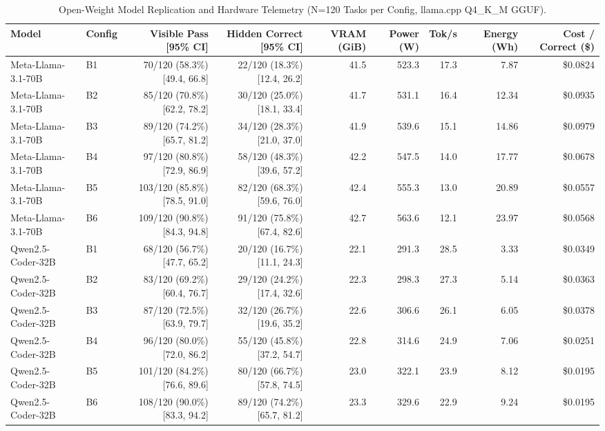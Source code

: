 \begin{table}[t]
\centering\small
\caption{Open-Weight Model Replication and Hardware Telemetry (N=120 Tasks per Config, llama.cpp Q4\_K\_M GGUF).}
\label{tab:open_weight}
\begin{tabular}{llrrrrrrr}
\toprule
Model & Config & Visible Pass [95\% CI] & Hidden Correct [95\% CI] & VRAM (GiB) & Power (W) & Tok/s & Energy (Wh) & Cost / Correct (\$) \\
\midrule
Meta-Llama-3.1-70B & B1 & 70/120 (58.3\%) [49.4, 66.8] & 22/120 (18.3\%) [12.4, 26.2] & 41.5 & 523.3 & 17.3 & 7.87 & \$0.0824 \\
Meta-Llama-3.1-70B & B2 & 85/120 (70.8\%) [62.2, 78.2] & 30/120 (25.0\%) [18.1, 33.4] & 41.7 & 531.1 & 16.4 & 12.34 & \$0.0935 \\
Meta-Llama-3.1-70B & B3 & 89/120 (74.2\%) [65.7, 81.2] & 34/120 (28.3\%) [21.0, 37.0] & 41.9 & 539.6 & 15.1 & 14.86 & \$0.0979 \\
Meta-Llama-3.1-70B & B4 & 97/120 (80.8\%) [72.9, 86.9] & 58/120 (48.3\%) [39.6, 57.2] & 42.2 & 547.5 & 14.0 & 17.77 & \$0.0678 \\
Meta-Llama-3.1-70B & B5 & 103/120 (85.8\%) [78.5, 91.0] & 82/120 (68.3\%) [59.6, 76.0] & 42.4 & 555.3 & 13.0 & 20.89 & \$0.0557 \\
Meta-Llama-3.1-70B & B6 & 109/120 (90.8\%) [84.3, 94.8] & 91/120 (75.8\%) [67.4, 82.6] & 42.7 & 563.6 & 12.1 & 23.97 & \$0.0568 \\
\midrule
Qwen2.5-Coder-32B & B1 & 68/120 (56.7\%) [47.7, 65.2] & 20/120 (16.7\%) [11.1, 24.3] & 22.1 & 291.3 & 28.5 & 3.33 & \$0.0349 \\
Qwen2.5-Coder-32B & B2 & 83/120 (69.2\%) [60.4, 76.7] & 29/120 (24.2\%) [17.4, 32.6] & 22.3 & 298.3 & 27.3 & 5.14 & \$0.0363 \\
Qwen2.5-Coder-32B & B3 & 87/120 (72.5\%) [63.9, 79.7] & 32/120 (26.7\%) [19.6, 35.2] & 22.6 & 306.6 & 26.1 & 6.05 & \$0.0378 \\
Qwen2.5-Coder-32B & B4 & 96/120 (80.0\%) [72.0, 86.2] & 55/120 (45.8\%) [37.2, 54.7] & 22.8 & 314.6 & 24.9 & 7.06 & \$0.0251 \\
Qwen2.5-Coder-32B & B5 & 101/120 (84.2\%) [76.6, 89.6] & 80/120 (66.7\%) [57.8, 74.5] & 23.0 & 322.1 & 23.9 & 8.12 & \$0.0195 \\
Qwen2.5-Coder-32B & B6 & 108/120 (90.0\%) [83.3, 94.2] & 89/120 (74.2\%) [65.7, 81.2] & 23.3 & 329.6 & 22.9 & 9.24 & \$0.0195 \\
\bottomrule
\end{tabular}
\end{table}

